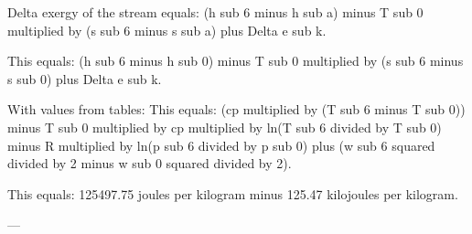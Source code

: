 Delta exergy of the stream equals:  
(h sub 6 minus h sub a) minus T sub 0 multiplied by (s sub 6 minus s sub a) plus Delta e sub k.  

This equals:  
(h sub 6 minus h sub 0) minus T sub 0 multiplied by (s sub 6 minus s sub 0) plus Delta e sub k.  

With values from tables:  
This equals:  
(cp multiplied by (T sub 6 minus T sub 0)) minus T sub 0 multiplied by cp multiplied by ln(T sub 6 divided by T sub 0) minus R multiplied by ln(p sub 6 divided by p sub 0) plus (w sub 6 squared divided by 2 minus w sub 0 squared divided by 2).  

This equals:  
125497.75 joules per kilogram minus 125.47 kilojoules per kilogram.  

---
